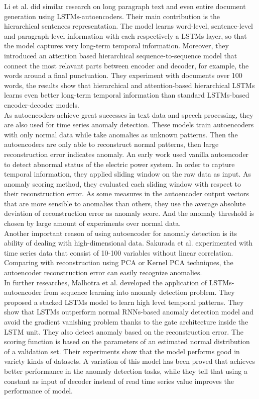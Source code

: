 Li et al. \cite{hierarchicalseq2seq} did similar research on long paragraph text and even entire document generation using LSTMs-autoencoders. Their main contribution is the hierarchical sentences representation. The model learns word-level, sentence-level and paragraph-level information with each respectively a LSTMs layer, so that the model captures very long-term temporal information. Moreover, they introduced an attention based hierarchical sequence-to-sequence model that connect the most relavant parts between encoder and decoder, for example, the words around a final punctuation. They experiment with documents over 100 words, the results show that hierarchical and attention-based hierarchical LSTMs learns even better long-term temporal information than standard LSTMs-based encoder-decoder models.\\

As autoencoders achieve great successes in text data and speech processing, they are also used for time series anomaly detection. These models train autoencoders with only normal data while take anomalies as unknown patterns. Then the autoencoders are only able to reconstruct normal patterns, then large reconstruction error indicates anomaly. An early work \cite{eps} used vanilla autoencoder to detect abnormal status of the electric power system. In order to capture temporal information, they applied sliding window on the raw data as input. As anomaly scoring method, they evaluated each sliding window with respect to their reconstruction error. As some measures in the autoencoder output vectors that are more sensible to anomalies than others, they use the average absolute deviation of reconstruction error as anomaly score. And the anomaly threshold is chosen by large amount of experiments over normal data.\\

Another important reason of using autoencoder for anomaly detection is its ability of dealing with high-dimensional data. Sakurada et al. \cite{ dimensionalityreduction} experimented with time series data that consist of 10-100 variables without linear correlation. Comparing with reconstruction using PCA or Kernel PCA techniques, the autoencoder reconstruction error can easily recognize anomalies.\\

In further researches, Malhotra et al. \cite{lstmad}\cite{encdecad} developed the application of LSTMs-autoencoder from sequence learning into anomaly detection problem. They proposed a stacked LSTMs model to learn high level temporal patterns. They show that LSTMs outperform normal RNNs-based anomaly detection model and avoid the gradient vanishing problem thanks to the gate architecture inside the LSTM unit. They also detect anomaly based on the reconstruction error. The scoring function is based on the parameters of an estimated normal distribution of a validation set. Their experiments show that the model performs good in variety kinds of datasets. A variation of this model \cite{timenet} has been proved that achieves better performance in the anomaly detection tasks, while they tell that using a constant as input of decoder instead of read time series value improves the performance of model.

